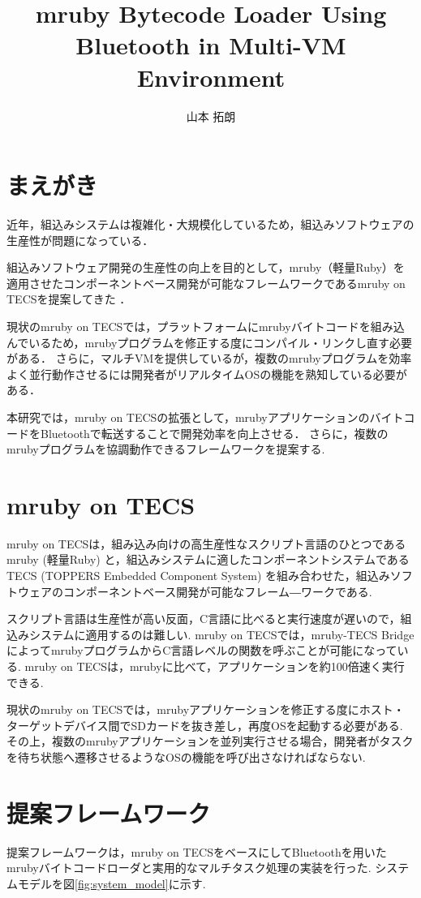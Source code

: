 \documentclass[a4j,10pt,twocolumn]{utf8/abstract}
\title{mruby Bytecode Loader Using Bluetooth in Multi-VM Environment}	%
\author{山本 拓朗} 		%
\begin{document}
\absttitle 		%

\section{まえがき}
近年，組込みシステムは複雑化・大規模化しているため，組込みソフトウェアの生産性が問題になっている．

組込みソフトウェア開発の生産性の向上を目的として，mruby（軽量Ruby）を適用させたコンポーネントベース開発が可能なフレームワークであるmruby on TECSを提案してきた \cite{mrubyontecs}．

現状のmruby on TECSでは，プラットフォームにmrubyバイトコードを組み込んでいるため，mrubyプログラムを修正する度にコンパイル・リンクし直す必要がある．
さらに，マルチVMを提供しているが，複数のmrubyプログラムを効率よく並行動作させるには開発者がリアルタイムOSの機能を熟知している必要がある．

本研究では，mruby on TECSの拡張として，mrubyアプリケーションのバイトコードをBluetoothで転送することで開発効率を向上させる．
さらに，複数のmrubyプログラムを協調動作できるフレームワークを提案する.
\section{mruby on TECS}
mruby on TECSは，組み込み向けの高生産性なスクリプト言語のひとつであるmruby (軽量Ruby) と，組込みシステムに適したコンポーネントシステムであるTECS (TOPPERS Embedded Component System) を組み合わせた，組込みソフトウェアのコンポーネントベース開発が可能なフレーム―ワークである.

スクリプト言語は生産性が高い反面，C言語に比べると実行速度が遅いので，組込みシステムに適用するのは難しい.
mruby on TECSでは，mruby-TECS BridgeによってmrubyプログラムからC言語レベルの関数を呼ぶことが可能になっている.
mruby on TECSは，mrubyに比べて，アプリケーションを約100倍速く実行できる.

現状のmruby on TECSでは，mrubyアプリケーションを修正する度にホスト・ターゲットデバイス間でSDカードを抜き差し，再度OSを起動する必要がある.
その上，複数のmrubyアプリケーションを並列実行させる場合，開発者がタスクを待ち状態へ遷移させるようなOSの機能を呼び出さなければならない.
　
\section{提案フレームワーク}
提案フレームワークは，mruby on TECSをベースにしてBluetoothを用いたmrubyバイトコードローダと実用的なマルチタスク処理の実装を行った.
システムモデルを図\ref{fig:system_model}に示す.
\end{document}
